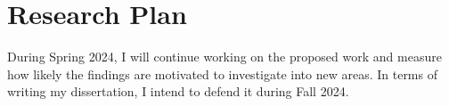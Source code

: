 
\section{Research Plan}
\label{sec:researchPlan}

During Spring 2024, I will continue working on the proposed work and measure how likely the findings are motivated to investigate into new areas. In terms of writing my dissertation, I intend to defend it during Fall 2024. 